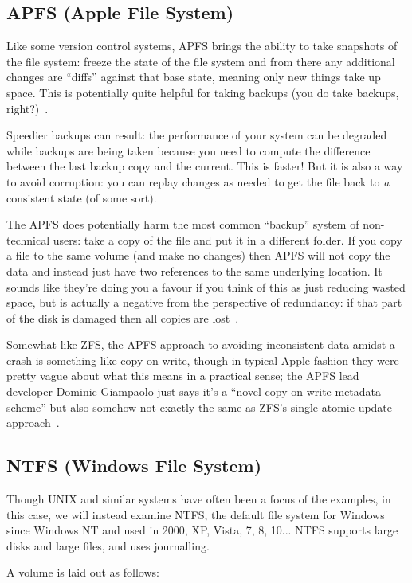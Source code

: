 \documentclass[a4paper]{report}
\begin{document}
\subsection*{APFS (Apple File System)}

Like some version control systems, APFS brings the ability to take snapshots of the file system: freeze the state of the file system and from there any additional changes are ``diffs'' against that base state, meaning only new things take up space. This is potentially quite helpful for taking backups (you do take backups, right?)~\cite{apfs}.

Speedier backups can result: the performance of your system can be degraded while backups are being taken because you need to compute the difference between the last backup copy and the current. This is faster! But it is also a way to avoid corruption: you can replay changes as needed to get the file back to \textit{a} consistent state (of some sort).

The APFS does potentially harm the most common ``backup'' system of non-technical users: take a copy of the file and put it in a different folder. If you copy a file to the same volume (and make no changes) then APFS will not copy the data and instead just have two references to the same underlying location. It sounds like they're doing you a favour if you think of this as just reducing wasted space, but is actually a negative from the perspective of redundancy: if that part of the disk is damaged then all copies are lost~\cite{apfs}.

Somewhat like ZFS, the APFS approach to avoiding inconsistent data amidst a crash is something like copy-on-write, though in typical Apple fashion they were pretty vague about what this means in a practical sense; the APFS lead developer Dominic Giampaolo just says it's a ``novel copy-on-write metadata scheme'' but also somehow not exactly the same as ZFS's single-atomic-update approach~\cite{apfs}.

\subsection*{NTFS (Windows File System)}
Though UNIX and similar systems have often been a focus of the examples, in this case, we will instead examine NTFS, the default file system for Windows since Windows NT and used in 2000, XP, Vista, 7, 8, 10... NTFS supports large disks and large files, and uses journalling.

A volume is laid out as follows:
\end{document}
